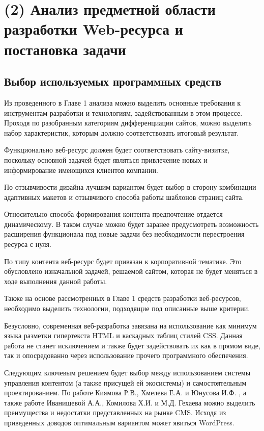 \section{(2) Анализ предметной области разработки Web-ресурса и постановка задачи}


\subsection{Выбор используемых программных средств}

Из проведенного в Главе 1 анализа можно выделить основные требования к инструментам разработки и технологиям, задействованным в этом процессе.
Проходя по разобранным категориям дифференциации сайтов, можно выделить набор характеристик, которым должно соответствовать итоговый результат.

Функционально веб-ресурс должен будет соответствовать сайту-визитке, поскольку основной задачей будет являться привлечение новых и информирование имеющихся клиентов компании.

По отзывчивости дизайна лучшим вариантом будет выбор в сторону комбинации адаптивных макетов и отзывчивого способа работы шаблонов страниц сайта.

Относительно способа формирования контента предпочтение отдается динамическому.
В таком случае можно будет заранее предусмотреть возможность расширения функционала под новые задачи без необходимости перестроения ресурса с нуля.

По типу контента веб-ресурс будет привязан к корпоративной тематике.
Это обусловлено изначальной задачей, решаемой сайтом, которая не будет меняться в ходе выполнения данной работы.

Также на основе рассмотренных в Главе 1 средств разработки веб-ресурсов, необходимо выделить технологии, подходящие под описанные выше критерии.

Безусловно, современная веб-разработка завязана на использование как минимум языка разметки гипертекста HTML и каскадных таблиц стилей CSS.
Данная работа не станет исключением и также будет задействовать их как в прямом виде, так и опосредованно через использование прочего программного обеспечения.

Следующим ключевым решением будет выбор между использованием системы управления контентом (а также присущей ей экосистемы) и самостоятельным проектированием.
По работе Киямова Р.В., Хмелева Е.А. и Юнусова И.Ф. \cite{kiyamov-cms}, а также работе Иванищевой А.А., Комилова Х.И. и М.Д. Гехаева \cite{ivanisheva-cms} можно выделить преимущества и недостатки представленных на рынке CMS.
Исходя из приведенных доводов оптимальным вариантом может явиться WordPress.

